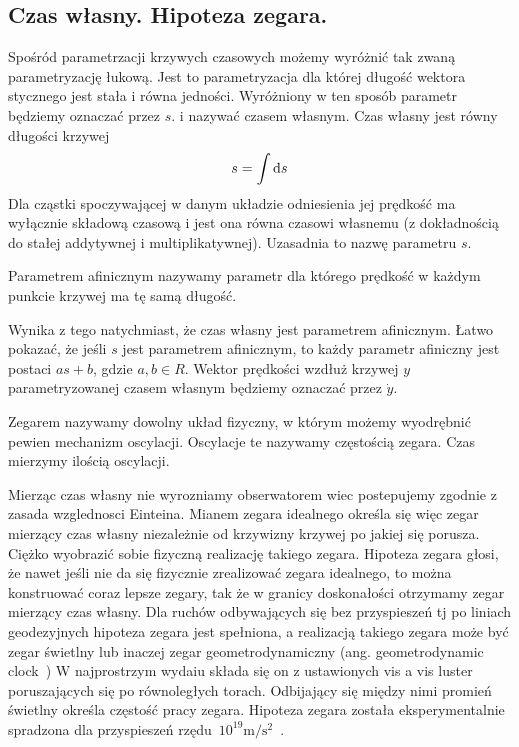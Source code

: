 \subsection{Czas własny. Hipoteza zegara.}
Spośród parametrzacji krzywych czasowych
 możemy wyróżnić tak zwaną parametryzację łukową.
Jest to parametryzacja dla której długość 
wektora stycznego jest stała i równa jedności.
Wyróżniony w ten sposób parametr będziemy oznaczać przez 
$s$. i nazywać czasem własnym.
Czas własny jest równy długości krzywej
\begin{align}
s = \int \text{d} s
\end{align}
Dla cząstki spoczywającej w danym układzie odniesienia jej prędkość
ma wyłącznie składową czasową i jest ona równa czasowi własnemu (z dokładnością
do stałej addytywnej i multiplikatywnej). Uzasadnia to nazwę parametru $s$.
\begin{definition}
Parametrem afinicznym nazywamy parametr dla którego 
prędkość w każdym punkcie krzywej ma tę samą długość.
\end{definition}
Wynika z tego natychmiast, że czas własny jest parametrem afinicznym.
Łatwo pokazać, że jeśli $s$ jest 
parametrem afinicznym, to każdy parametr afiniczny 
jest postaci $a s+b$, gdzie $a,b\in R$.
Wektor prędkości wzdłuż krzywej $y$ parametryzowanej czasem 
własnym będziemy oznaczać przez $\dot{y}$.

\begin{definition}
Zegarem nazywamy dowolny układ fizyczny, w którym możemy wyodrębnić pewien
mechanizm oscylacji. Oscylacje te nazywamy częstością zegara. Czas mierzymy
ilością oscylacji.
\end{definition}
Mierząc czas własny nie wyrozniamy obserwatorem wiec 
postepujemy zgodnie z zasada wzglednosci Einteina. 
Mianem zegara idealnego określa się więc zegar mierzący czas własny
niezależnie od krzywizny krzywej po jakiej się porusza.
Ciężko wyobrazić sobie fizyczną realizację takiego zegara.
Hipoteza zegara głosi, że nawet jeśli nie da się fizycznie zrealizować 
zegara idealnego, to można konstruować coraz lepsze zegary, 
tak że w granicy doskonałości otrzymamy zegar mierzący czas własny. 
Dla ruchów odbywających się bez przyspieszeń tj po liniach geodezyjnych
hipoteza zegara jest spełniona, a 
realizacją takiego zegara może być zegar świetlny lub inaczej
zegar geometrodynamiczny (ang. geometrodynamic 
clock~\cite{ohanian2013gravitation})
W najprostrzym wydaiu składa się on z ustawionych 
vis a vis luster poruszających się po równoległych torach.
Odbijający się między nimi promień świetlny 
określa częstość pracy zegara. 
Hipoteza zegara została eksperymentalnie spradzona dla 
przyspieszeń 
rzędu~$10^{19}\si{\metre\per\second^2}$~\cite{Bailey1977}.

